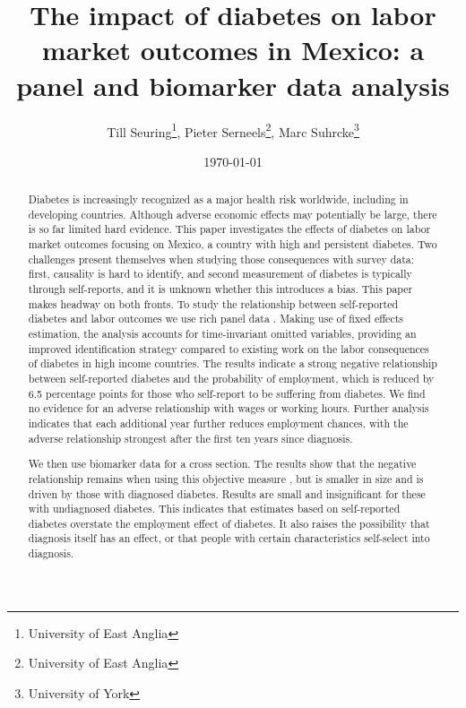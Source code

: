 \documentclass[12pt,english,british]{article}
\begin{document}
\title{The impact of diabetes on labor market outcomes in Mexico: a panel and biomarker data analysis}

\author{Till Seuring\footnote{University of East Anglia}, Pieter
Serneels\footnote{University of East Anglia}, Marc Suhrcke\footnote{University
  of York}}
\affil{}

\date{\today}


\maketitle 

\begin{abstract}
Diabetes is increasingly recognized as a major health risk worldwide, including in developing countries. Although adverse economic effects may potentially be large, there is so far limited hard evidence. This paper investigates the effects of diabetes on labor market outcomes focusing on Mexico, a country with high and persistent diabetes. Two challenges present themselves when studying those consequences with survey data: first, causality is hard to identify, and second measurement of diabetes is typically through self-reports, and it is unknown whether this introduces a bias. This paper makes headway on both fronts. To study the relationship between self-reported diabetes and labor outcomes we use rich panel data . Making use of fixed effects estimation, the analysis accounts for time-invariant omitted variables, providing an improved identification strategy compared to existing work on the labor consequences of diabetes in high income countries. The results indicate a strong negative relationship between self-reported diabetes and the probability of employment, which is reduced by 6.5 percentage points for those who self-report to be suffering from diabetes. We find no evidence for an adverse relationship with wages or working hours. Further analysis indicates that each additional year further reduces employment chances, with the adverse relationship strongest after the first ten years since diagnosis. 

We then use biomarker data for a cross section. The results show that the negative relationship remains when using this objective measure , but is smaller in size and is driven by those with diagnosed diabetes. Results are small and insignificant for these with undiagnosed diabetes. This indicates that estimates based on self-reported diabetes overstate the employment effect of diabetes. It also raises the possibility that diagnosis itself has an effect, or that people with certain characteristics self-select into diagnosis. 


\end{abstract}
\end{document}
